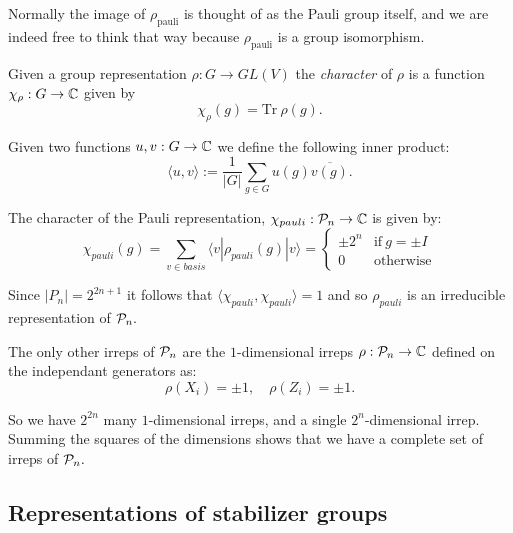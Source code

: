 \documentclass[12pt]{article}
\begin{document}

Normally the image of 
$\rho_{\mathrm{pauli}}$ is thought of as the
Pauli group itself, and we are indeed free to think
that way because $\rho_{\mathrm{pauli}}$ is a group
isomorphism.

Given a group representation $\rho:G\to GL(V)$
the {\it character} of $\rho$ is a function
$\chi_\rho:G\to \mathbb{C}$ given by
$$
    \chi_\rho(g) = \mbox{Tr}\ \rho(g).
$$

Given two functions $u,v : G \to \mathbb{C}$ 
we define the following inner product:
$$
    \langle u, v \rangle := \frac{1}{|G|} \sum_{g\in G} u(g) \overline{v(g)}.
$$

The character of the Pauli representation, $\chi_{{pauli}}:\mathcal{P}_n\to\mathbb{C}$
is given by:
$$
\chi_{{pauli}}(g) = \sum_{v \in basis} \langle v | \rho_{{pauli}}(g) | v \rangle
    = \left\{ \begin{array}{ll}
 \pm 2^n &\mbox{if}\ g=\pm I\\
 0 &\mbox{otherwise}\end{array}\right.
$$

Since $|P_n|=2^{2n+1}$ it follows that
$\langle\chi_{pauli},\chi_{pauli}\rangle = 1$ and
so $\rho_{pauli}$ is an irreducible representation of $\mathcal{P}_n.$

The only other irreps of $\mathcal{P}_n$ are 
the $1$-dimensional irreps $\rho:\mathcal{P}_n\to\mathbb{C}$
defined on the independant generators as:
    $$ \rho(X_i) = \pm 1,\quad \rho(Z_i) = \pm 1.$$

So we have $2^{2n}$ many $1$-dimensional irreps,
and a single $2^n$-dimensional irrep.
Summing the squares of the dimensions
shows that we have a complete set of irreps of $\mathcal{P}_n.$

\subsection{Representations of stabilizer groups}
\end{document}
